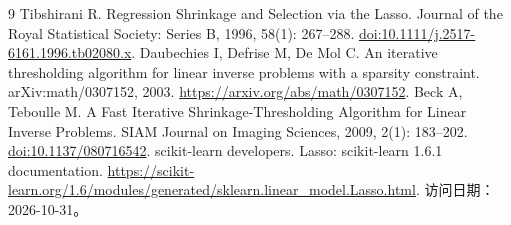 \documentclass[UTF8,11pt,a4paper,fontset=fandol]{ctexart}
\begin{document}
\begin{thebibliography}{9}
\small\setlength{\itemsep}{0pt}\setlength{\parskip}{0pt}
 Tibshirani R. Regression Shrinkage and Selection via the Lasso.
Journal of the Royal Statistical Society: Series B, 1996, 58(1): 267--288.
\href{https://doi.org/10.1111/j.2517-6161.1996.tb02080.x}{doi:10.1111/j.2517-6161.1996.tb02080.x}.
 Daubechies I, Defrise M, De Mol C.
An iterative thresholding algorithm for linear inverse problems with a sparsity constraint.
arXiv:math/0307152, 2003.
\url{https://arxiv.org/abs/math/0307152}.
 Beck A, Teboulle M. A Fast Iterative Shrinkage-Thresholding Algorithm for Linear Inverse Problems.
SIAM Journal on Imaging Sciences, 2009, 2(1): 183--202.
\href{https://doi.org/10.1137/080716542}{doi:10.1137/080716542}.
 scikit-learn developers. Lasso: scikit-learn 1.6.1 documentation.
\url{https://scikit-learn.org/1.6/modules/generated/sklearn.linear_model.Lasso.html}.
访问日期：2026-10-31。
\end{thebibliography}
\end{document}
